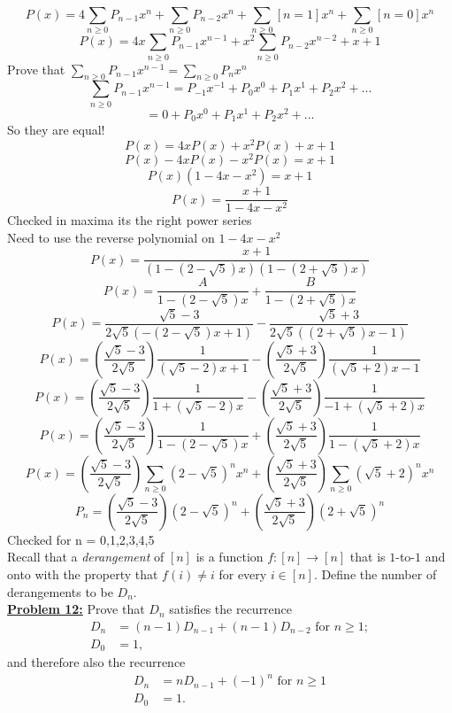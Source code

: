 \documentclass[10pt, AMS Euler]{article}
\begin{document}
    $$ P(x) = 4 \sum_{n \geq 0} P_{n-1} x^n + \sum_{n \geq 0} P_{n-2} x^n + \sum_{n \geq 0} [n=1] x^n + \sum_{n \geq 0} [n=0] x^n $$
    $$ P(x) = 4x \sum_{n \geq 0} P_{n-1} x^{n-1} + x^2 \sum_{n \geq 0} P_{n-2} x^{n-2} + x + 1 $$
    Prove that $\sum_{n \geq 0} P_{n-1} x^{n-1} = \sum_{n \geq 0} P_n x^n$
    $$ \sum_{n \geq 0} P_{n-1} x^{n-1} = P_{-1}x^{-1} + P_{0}x^{0} + P_{1}x^{1} + P_{2}x^{2} + ... $$
    $$ = 0 + P_{0}x^{0} + P_{1}x^{1} + P_{2}x^{2} + ... $$
    So they are equal!
    $$ P(x) = 4x P(x) + x^2 P(x) + x + 1 $$
    $$ P(x) - 4x P(x) - x^2 P(x) = x + 1 $$
    $$ P(x)(1 - 4x - x^2) = x + 1 $$
    $$ P(x) = \frac{x + 1}{1 - 4x - x^2} $$
    Checked in maxima its the right power series \\
    Need to use the reverse polynomial on $1 - 4x - x^2$ \\
    $$ P(x) = \frac{x + 1}{(1 - (2 - \sqrt{5})x)(1 - (2+\sqrt{5})x)} $$
    $$ P(x) = \frac{A}{1 - (2 - \sqrt{5})x} + \frac{B}{1 - (2+\sqrt{5})x} $$
    $$ P(x) = \frac{\sqrt{5}-3}{2\sqrt{5}(-(2-\sqrt{5})x+1)} - \frac{\sqrt{5} + 3}{2\sqrt{5}((2+\sqrt{5})x-1)} $$
    $$ P(x) = (\frac{\sqrt{5}-3}{2\sqrt{5}}) \frac{1}{(\sqrt{5}-2)x+1} - (\frac{\sqrt{5} + 3}{2\sqrt{5}}) \frac{1}{(\sqrt{5}+2)x-1} $$
    $$ P(x) = (\frac{\sqrt{5}-3}{2\sqrt{5}}) \frac{1}{1+(\sqrt{5}-2)x} - (\frac{\sqrt{5} + 3}{2\sqrt{5}}) \frac{1}{-1+(\sqrt{5}+2)x} $$
    $$ P(x) = (\frac{\sqrt{5}-3}{2\sqrt{5}}) \frac{1}{1-(2-\sqrt{5})x} + (\frac{\sqrt{5} + 3}{2\sqrt{5}}) \frac{1}{1-(\sqrt{5}+2)x} $$
    $$ P(x) = (\frac{\sqrt{5}-3}{2\sqrt{5}}) \sum_{n \geq 0} (2-\sqrt{5})^n x^n + (\frac{\sqrt{5} + 3}{2\sqrt{5}}) \sum_{n \geq 0} (\sqrt{5}+2)^n x^n $$
    $$ P_n = (\frac{\sqrt{5}-3}{2\sqrt{5}}) (2-\sqrt{5})^n + (\frac{\sqrt{5} + 3}{2\sqrt{5}}) (2+\sqrt{5})^n $$
    Checked for n = 0,1,2,3,4,5\\
	
	 Recall that a \emph{derangement} of $[n]$ is a function 
	$f:[n] \to [n]$ that is $1$-to-$1$ and onto with the property that $f(i) \neq i$ for every $i \in [n]$.  
	Define the number of derangements to be $D_n$. \\
	
	\noindent\underline{\bf Problem 12:}  Prove that $D_n$ satisfies the recurrence 
	\begin{align*} 
            D_n & = (n-1)D_{n-1} + (n-1)D_{n-2} \mbox{ for } n \geq 1;\\
		D_0 & = 1, 
	\end{align*}
	and therefore also the recurrence 
	\begin{align*}
		D_n & = nD_{n-1} + (-1)^n \mbox{ for } n \geq 1 \\
		D_0 & = 1.
	\end{align*}
\end{document}
